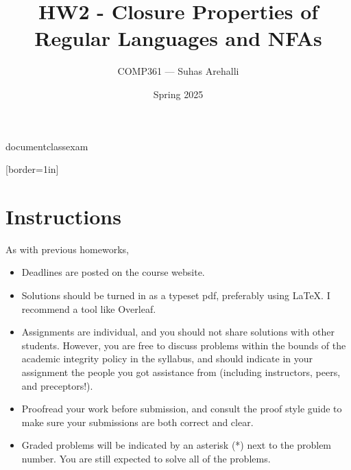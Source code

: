 documentclass{exam}
\usepackage{graphicx} %
\usepackage{listings}
\usepackage{amsmath}
\usepackage{algorithmicx}
\usepackage{algpseudocode}
\usepackage{geometry}[border=1in]
\usepackage{algorithm}
\usepackage{amsmath}
\usepackage{amssymb}
\usepackage{amsthm}
\usepackage{listings}
\usepackage{mathtools}
\usepackage{tikz}
\usetikzlibrary{arrows.meta,automata,positioning}

\newtheorem*{statement}{Statement}

\title{HW2 - Closure Properties of Regular Languages and NFAs}
\author{COMP361 --- Suhas Arehalli}
\date{Spring 2025}


\maketitle

\section*{Instructions}
As with previous homeworks, 

\begin{itemize}
    \item Deadlines are posted on the course website.
    \item Solutions should be turned in as a typeset pdf, preferably using LaTeX. I recommend a tool like Overleaf. 
    \item Assignments are individual, and you should not share solutions with other students. However, you are free to discuss problems within the bounds of the academic integrity policy in the syllabus, and should indicate in your assignment the people you got assistance from (including instructors, peers, and preceptors!). 
    \item Proofread your work before submission, and consult the proof style guide to make sure your submissions are both correct and clear.
    \item Graded problems will be indicated by an asterisk (*) next to the problem number. You are still expected to solve all of the problems.
\end{itemize}

